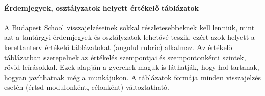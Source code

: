 \paragraph{Érdemjegyek, osztályzatok helyett értékelő táblázatok} A
Budapest\linebreak
School visszajelzéseinek sokkal részletesebbeknek kell lenniük, mint azt a tantárgyi érdemjegyek és osztályzatok lehetővé teszik, ezért azok helyett a kerettanterv értékelő táblázatokat (angolul rubric) alkalmaz. Az értékelő táblázatban szerepelnek az értékelés szempontjai és szempontonkénti szintek, rövid leírásokkal. Ezek alapján a gyerekek maguk is láthatják, hogy hol tartanak, hogyan javíthatnak még a munkájukon. A táblázatok formája minden visszajelzés esetén (értsd modulonként, célonként) változtatható.


